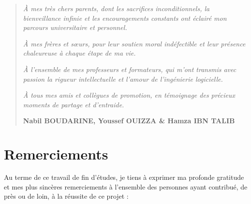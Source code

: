 \begin{quote}
\textit{À mes très chers parents, dont les sacrifices inconditionnels, la bienveillance infinie et les encouragements constants ont éclairé mon parcours universitaire et personnel.}

\vspace{0.6cm}
\textit{À mes frères et sœurs, pour leur soutien moral indéfectible et leur présence chaleureuse à chaque étape de ma vie.}

\vspace{0.6cm}
\textit{À l'ensemble de mes professeurs et formateurs, qui m'ont transmis avec passion la rigueur intellectuelle et l'amour de l'ingénierie logicielle.}

\vspace{0.6cm}
\textit{À tous mes amis et collègues de promotion, en témoignage des précieux moments de partage et d'entraide.}

\vspace{1cm}
\begin{flushright}
\textbf{Nabil BOUDARINE, Youssef OUIZZA \& Hamza IBN TALIB}
\end{flushright}
\end{quote}

\clearpage

\chapter*{Remerciements}

Au terme de ce travail de fin d'études, je tiens à exprimer ma profonde gratitude et mes plus sincères remerciements à l'ensemble des personnes ayant contribué, de près ou de loin, à la réussite de ce projet :


